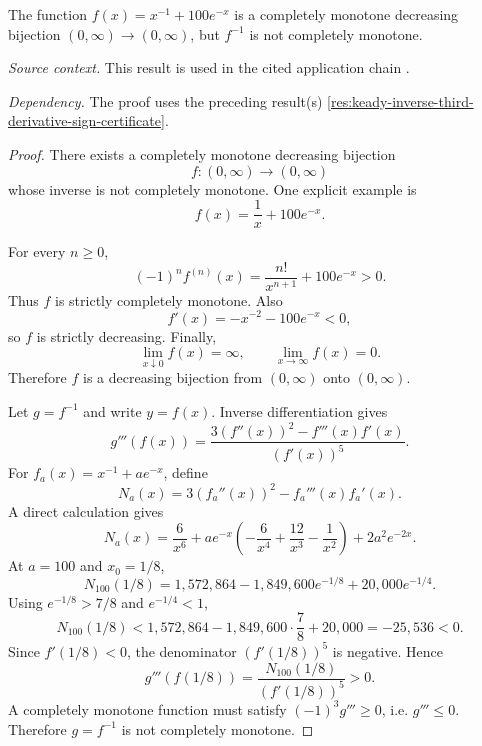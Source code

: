 \begin{counterexample}
\label{res:keady-self-bijection-inverse-cm-negative-example}
The function \(f(x)=x^{-1}+100e^{-x}\) is a completely monotone decreasing bijection \((0,\infty)\to(0,\infty)\), but \(f^{-1}\) is not completely monotone.

\emph{Source context.} This result is used in the cited application chain \cite{app-app-0035-source}.

\emph{Dependency.} The proof uses the preceding result(s) \ref{res:keady-inverse-third-derivative-sign-certificate}.
\end{counterexample}
\begin{proof}
There exists a completely monotone decreasing bijection
\[
f:(0,\infty)\to(0,\infty)
\]
whose inverse is not completely monotone. One explicit example is
\[
f(x)=\frac1x+100e^{-x}.
\]

For every \(n\ge0\),
\[
(-1)^n f^{(n)}(x)=\frac{n!}{x^{n+1}}+100e^{-x}>0.
\]
Thus \(f\) is strictly completely monotone. Also
\[
f'(x)=-x^{-2}-100e^{-x}<0,
\]
so \(f\) is strictly decreasing. Finally,
\[
\lim_{x\downarrow0}f(x)=\infty,
\qquad
\lim_{x\to\infty}f(x)=0.
\]
Therefore \(f\) is a decreasing bijection from \((0,\infty)\) onto \((0,\infty)\).

Let \(g=f^{-1}\) and write \(y=f(x)\). Inverse differentiation gives
\[
g'''(f(x))=\frac{3(f''(x))^2-f'''(x)f'(x)}{(f'(x))^5}.
\]
For \(f_a(x)=x^{-1}+ae^{-x}\), define
\[
N_a(x)=3(f_a''(x))^2-f_a'''(x)f_a'(x).
\]
A direct calculation gives
\[
N_a(x)=\frac6{x^6}+ae^{-x}\left(-\frac6{x^4}+\frac{12}{x^3}-\frac1{x^2}\right)+2a^2e^{-2x}.
\]
At \(a=100\) and \(x_0=1/8\),
\[
N_{100}(1/8)=1{,}572{,}864-1{,}849{,}600e^{-1/8}+20{,}000e^{-1/4}.
\]
Using \(e^{-1/8}>7/8\) and \(e^{-1/4}<1\),
\[
N_{100}(1/8)<1{,}572{,}864-1{,}849{,}600\cdot\frac78+20{,}000=-25{,}536<0.
\]
Since \(f'(1/8)<0\), the denominator \((f'(1/8))^5\) is negative. Hence
\[
g'''(f(1/8))=\frac{N_{100}(1/8)}{(f'(1/8))^5}>0.
\]
A completely monotone function must satisfy \((-1)^3g'''\ge0\), i.e. \(g'''\le0\). Therefore \(g=f^{-1}\) is not completely monotone.
\end{proof}

